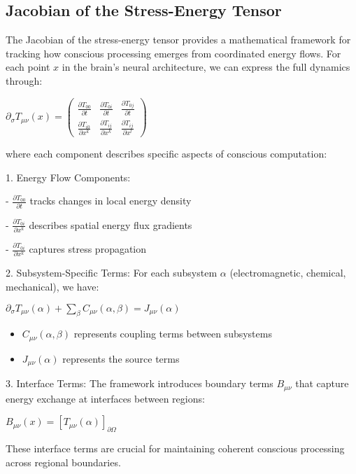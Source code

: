 \begin{refsection}
\subsection{Jacobian of the Stress-Energy Tensor}

The Jacobian of the stress-energy tensor provides a mathematical framework for tracking how conscious processing emerges from coordinated energy flows. For each point $x$ in the brain's neural architecture, we can express the full dynamics through:

$\partial_\sigma T_{\mu\nu}(x) = \begin{pmatrix} 
\frac{\partial T_{00}}{\partial t} & \frac{\partial T_{0i}}{\partial t} & \frac{\partial T_{0j}}{\partial t} \\[1em]
\frac{\partial T_{i0}}{\partial x^k} & \frac{\partial T_{ij}}{\partial x^k} & \frac{\partial T_{ij}}{\partial x^l}
\end{pmatrix}$

where each component describes specific aspects of conscious computation:

1. Energy Flow Components:

- $\frac{\partial T_{00}}{\partial t}$ tracks changes in local energy density

- $\frac{\partial T_{0i}}{\partial x^k}$ describes spatial energy flux gradients

- $\frac{\partial T_{0i}}{\partial x^k}$ captures stress propagation

2. Subsystem-Specific Terms:
For each subsystem $\alpha$ (electromagnetic, chemical, mechanical), we have:

$\partial_\sigma T_{\mu\nu}(\alpha) + \sum_\beta C_{\mu\nu}(\alpha,\beta) = J_{\mu\nu}(\alpha)$

\begin{itemize}
\item $C_{\mu\nu}(\alpha,\beta)$ represents coupling terms between subsystems
\item $J_{\mu\nu}(\alpha)$ represents the source terms
\end{itemize}

3. Interface Terms:
The framework introduces boundary terms $B_{\mu\nu}$ that capture energy exchange at interfaces between regions:

$B_{\mu\nu}(x) = [T_{\mu\nu}(\alpha)]_{\partial\Omega}$

These interface terms are crucial for maintaining coherent conscious processing across regional boundaries.


\end{refsection}
